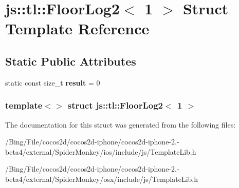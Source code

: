 \hypertarget{structjs_1_1tl_1_1_floor_log2_3_011_01_4}{\section{js\-:\-:tl\-:\-:Floor\-Log2$<$ 1 $>$ Struct Template Reference}
\label{structjs_1_1tl_1_1_floor_log2_3_011_01_4}
}
\subsection*{Static Public Attributes}
\begin{DoxyCompactItemize}
\item 
\hypertarget{structjs_1_1tl_1_1_floor_log2_3_011_01_4_ac28782ce0708c56269263a7161ae6064}{static const size\-\_\-t {\bfseries result} = 0}\label{structjs_1_1tl_1_1_floor_log2_3_011_01_4_ac28782ce0708c56269263a7161ae6064}

\end{DoxyCompactItemize}
\subsubsection*{template$<$$>$ struct js\-::tl\-::\-Floor\-Log2$<$ 1 $>$}



The documentation for this struct was generated from the following files\-:\begin{DoxyCompactItemize}
\item 
/\-Bing/\-File/cocos2d/cocos2d-\/iphone/cocos2d-\/iphone-\/2.-\/beta4/external/\-Spider\-Monkey/ios/include/js/Template\-Lib.\-h\item 
/\-Bing/\-File/cocos2d/cocos2d-\/iphone/cocos2d-\/iphone-\/2.-\/beta4/external/\-Spider\-Monkey/osx/include/js/Template\-Lib.\-h\end{DoxyCompactItemize}
